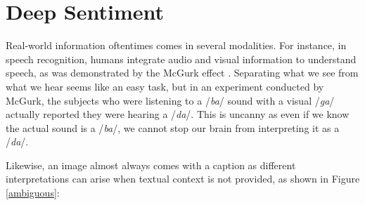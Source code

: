 \chapter{Deep Sentiment}

Real-world information oftentimes comes in several modalities. For instance, in speech recognition, humans integrate audio and visual information to understand speech, as was demonstrated by the McGurk effect \cite{mcgurk}. Separating what we see from what we hear seems like an easy task, but in an experiment conducted by McGurk, the subjects who were listening to a /{\em ba}/ sound with a visual /{\em ga}/ actually reported they were hearing a /{\em da}/. This is uncanny as even if we know the actual sound is a /{\em ba}/, we cannot stop our brain from interpreting it as a /{\em da}/.

Likewise, an image almost always comes with a caption as different interpretations can arise when textual context is not provided, as shown in Figure \ref{ambiguous}:


